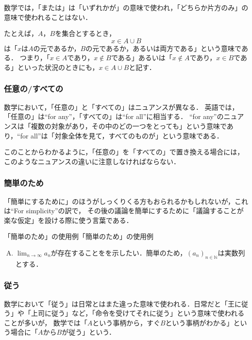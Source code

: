 \documentclass[a4paper,11pt]{ltjsarticle}
\begin{document}
数学では，「または」は「いずれかが」の意味で使われ，「どちらか片方のみ」の意味で使われることはない．

たとえば，$A$，$B$を集合とするとき，
\[
x \in A \cup B
\]
は「$x$は$A$の元であるか，$B$の元であるか，あるいは両方である」という意味である．
つまり，「$ x \in A$であり，$x \notin  B$である」あるいは「$ x \notin A$であり，$x \in B$である」といった状況のときにも，$x \in A \cup B$と記す．

\subsubsection{任意の/すべての}

数学において，「任意の」と「すべての」はニュアンスが異なる．
英語では，「任意の」は``for any''，「すべての」は``for all''に相当する．
``for any''のニュアンスは「複数の対象があり，その中のどの一つをとっても」という意味であり，``for all''は「対象全体を見て，すべてのものが」という意味である．

このことからわかるように，「任意の」を「すべての」で置き換える場合には，このようなニュアンスの違いに注意しなければならない．

\subsubsection{簡単のため}

「簡単にするために」のほうがしっくりくる方もおられるかもしれないが，これは``For simplicity''の訳で，
その後の議論を簡単にするために「議論することが楽な仮定」を設ける際に使う言葉である．

\begin{example}{「簡単のため」の使用例}{「簡単のため」の使用例}
    \begin{enumerate}[(A)]
  \item $\lim_{n \to \infty} a_n$が存在することをを示したい．簡単のため，$(a_n)_{n \in \mathbb{N}}$は実数列とする．
  \end{enumerate}
\end{example}

\subsubsection{従う}

数学において「従う」は日常とはまた違った意味で使われる．日常だと「王に従う」や「上司に従う」など，「命令を受けてそれに従う」という意味で使われることが多いが，
数学では「$A$という事柄から，すぐ$B$という事柄がわかる」という場合に「$A$から$B$が従う」という．
\end{document}
